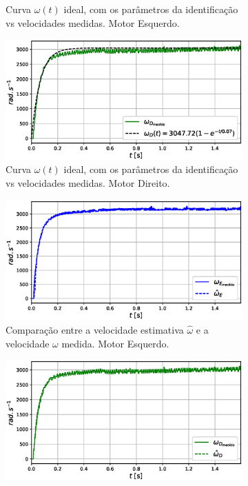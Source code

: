\begin{figure}[H]
\begin{subfigure}{.5\textwidth}
    \caption{Curva $\omega(t)$ ideal, com os parâmetros da identificação vs velocidades medidas. Motor Esquerdo.}
    \label{fig:exp01:regressao_medido_esquerdo}
    \end{subfigure}
    \hfill
    \begin{subfigure}{.5\textwidth}
    \centering
    \includegraphics[width=\textwidth]{figuras/resultados/exp01/regressao_vs_medido_direito100.eps}
    \caption{Curva $\omega(t)$ ideal, com os parâmetros da identificação vs velocidades medidas. Motor Direito.}
    \label{fig:exp01:regressao_medido_direito}
    \end{subfigure}
    \hfill
    \begin{subfigure}{.5\textwidth}
    \centering
    \includegraphics[width=\textwidth]{figuras/resultados/exp01/filtro_vs_sem_filtro_esquerdo100.eps}
    \caption{Comparação entre a velocidade estimativa $\hat{\omega}$ e a velocidade $\omega$ medida. Motor Esquerdo.}
    \label{fig:exp01:filtragem_esquerdo}
    \end{subfigure}
    \hfill
    \begin{subfigure}{.5\textwidth}
    \centering
    \includegraphics[width=\textwidth]{figuras/resultados/exp01/filtro_vs_sem_filtro_direito100.eps}

\end{subfigure}
\end{figure}
